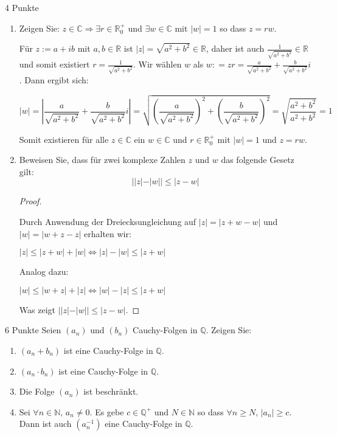 \documentclass{problemset}
\begin{document}
\begin{problem}{4 Punkte}
\begin{enumerate}
    \item Zeigen Sie: $z \in \mathbb{C} \Rightarrow \exists r \in \mathbb{R}^+_0$ und
          $\exists w \in \mathbb{C}$ mit $|w| = 1$ so dass $z = rw$.

          Für $z := a + ib$ mit $a,b \in \mathbb{R}$ ist $|z| = \sqrt{a^2 + b^2} \in
              \mathbb{R}$, daher ist auch $\frac{1}{\sqrt{a^2 + b^2}} \in \mathbb{R}$ und
          somit existiert $r = \frac{1}{\sqrt{a^2 + b^2}}$. Wir wählen $w$ als $w : = zr
              = \frac{a}{\sqrt{a^2 + b^2}} + \frac{b}{\sqrt{a^2 + b^2}}i$. Dann ergibt sich:

          \[
              |w| = \left|\frac{a}{\sqrt{a^2 + b^2}} + \frac{b}{\sqrt{a^2 + b^2}}i\right| = \sqrt{\left(\frac{a}{\sqrt{a^2 + b^2}}\right)^2 + \left(\frac{b}{\sqrt{a^2 + b^2}}\right)^2} = \sqrt{\frac{a^2 + b^2}{a^2 + b^2}} = 1
          \]

          Somit existieren für alle $z \in \mathbb{C}$ ein $w \in \mathbb{C}$ und $r \in
              \mathbb{R}^+_0$ mit $|w| = 1$ und $z = rw$.

    \item Beweisen Sie, dass für zwei komplexe Zahlen $z$ und $w$ das folgende Gesetz
          gilt:
          \[ ||z| - |w|| \leq |z - w| \]

          \begin{proof}
              $ $

              Durch Anwendung der Dreiecksungleichung auf $|z| = |z+w-w|$ und $|w| = |w+z-z|$
              erhalten wir:

              $|z| \leq |z+w| + |w| \Leftrightarrow |z| - |w| \leq |z+w|$

              Analog dazu:

              $|w| \leq |w+z| + |z| \Leftrightarrow |w| - |z| \leq |z+w|$

              Was zeigt $||z| - |w|| \leq |z - w|$.
          \end{proof}

\end{enumerate}
\end{problem}

\begin{problem}{6 Punkte}
Seien $(a_n)$ und $(b_n)$ Cauchy-Folgen in $\mathbb{Q}$. Zeigen Sie:
\begin{enumerate}
    \item $(a_n + b_n)$ ist eine Cauchy-Folge in $\mathbb{Q}$.
    \item $(a_n \cdot b_n)$ ist eine Cauchy-Folge in $\mathbb{Q}$.
    \item Die Folge $(a_n)$ ist beschränkt.
    \item Sei $\forall n \in \mathbb{N},\, a_n \neq 0$. Es gebe $c \in \mathbb{Q}^+$ und
          $N \in \mathbb{N}$ so dass $\forall n \geq N,\, |a_n| \geq c$. Dann ist auch
          $(a_n^{-1})$ eine Cauchy-Folge in $\mathbb{Q}$.
\end{enumerate}
\end{problem}
\end{document}
